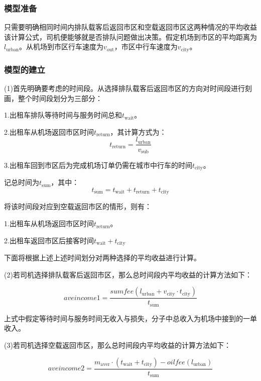 \documentclass[withoutpreface,bwprint]{cumcmthesis} %
\begin{document}
\subsubsection{模型准备}

只需要明确相同时间内排队载客后返回市区和空载返回市区这两种情况的平均收益该计算公式，司机便能够就是否排队问题做出决策。假定机场到市区的平均距离为$l_{\mathrm{urban}}$。从机场到市区行车速度为$v_{\mathrm{out}}$，市区中行车速度为$v_{\mathrm{city}}$。
\par

\subsubsection{模型的建立}

(1)首先明确要考虑的时间段。从选择排队载客后返回市区的方向对时间段进行刻画，整个时间段划分为三部分：

1.出租车排队等待时间与服务时间总和$t_{ \mathrm{wait}}$。

2.出租车从机场返回市区时间$t_{ \mathrm{return}}$，其计算方式为：
\begin{equation}
	t_{ \mathrm{return}}=\frac{l_{\mathrm{urban}}}{v_{\mathrm{sub}}}
\end{equation}

3.出租车回到市区后为完成机场订单仍需在城市中行车的时间$t_{\mathrm{city}}$。

记总时间为$t_{ \mathrm{sum}}$，其中：
\begin{equation}
	t_{ \mathrm{sum}}=t_{ \mathrm{wait}}+t_{ \mathrm{return}}+t_{\mathrm{city}}
\end{equation}

将该时间段对应到空载返回市区的情形，则有：

1.出租车从机场返回市区时间$t_{ \mathrm{return}}$。

2.出租车返回市区后接客时间$t_{ \mathrm{wait}}+t_{\mathrm{city}}$

下面将根据上述上述时间划分对两种选择的平均收益进行计算。

(2)若司机选择排队载客后返回市区，那么总时间段内平均收益的计算方法如下：\par
\begin{equation}
	aveincome1=\frac{sumfee(l_{\mathrm{urban}}+v_{\mathrm{city}} \cdot t_{\mathrm{city}})}{t_{ \mathrm{sum}}}
\end{equation}
\par
上式中假定等待时间与服务时间无收入与损失，分子中总收入为机场中接到的一单收入。

\par \par
(3)若司机选择空载返回市区，那么总时间段内平均收益的计算方法如下：\par
\begin{equation}
	aveincome2=\frac{m_{\mathrm{aver}}\cdot(t_{\mathrm{wait}}+t_{\mathrm{city}})-oilfee(l_{\mathrm{urban}})}{t_{ \mathrm{sum}}}
\end{equation}
\end{document}
